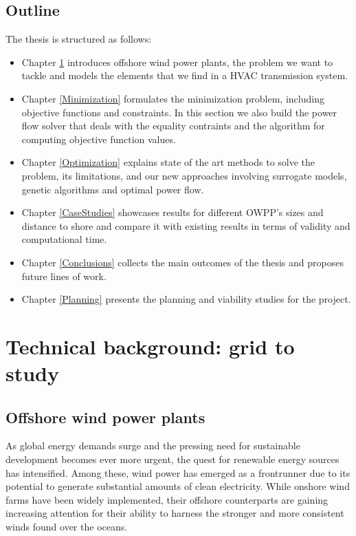 \documentclass[a4paper,11pt, titlepage, twoside]{article}
\begin{document}
\newpage

\subsection{Outline}

The thesis is structured as follows:
\begin{itemize}
    \item Chapter \ref{Grid} introduces offshore wind power plants, the problem we want to tackle and models the elements that we find in a HVAC transmission system.
    \item Chapter \ref{Minimization}  formulates the minimization problem, including objective functions and constraints. In this section we also
    build the power flow solver that deals with the equality contraints and the algorithm for computing objective function values.
    \item Chapter \ref{Optimization} explains state of the art methods to solve the problem, its limitations, and our new approaches involving surrogate models,
     genetic algorithms and optimal power flow.
    \item Chapter \ref{CaseStudies} showcases results for different OWPP's sizes and distance to shore and compare it with existing results in terms of validity
    and computational time.
    \item Chapter \ref{Conclusions} collects the main outcomes of the thesis and proposes future lines of work.
    \item Chapter \ref{Planning} presents the planning and viability studies for the project.
\end{itemize}
\section{Technical background: grid to study}\label{Grid}

\subsection{Offshore wind power plants}
As global energy demands surge and the pressing need for sustainable development becomes ever more urgent, 
the quest for renewable energy sources has intensified. Among these, wind power has emerged as a frontrunner due to its potential to generate substantial amounts of clean electricity.
While onshore wind farms have been widely implemented, their offshore counterparts are gaining increasing attention for their ability to harness the stronger and more consistent winds found over the oceans.\par
\end{document}
